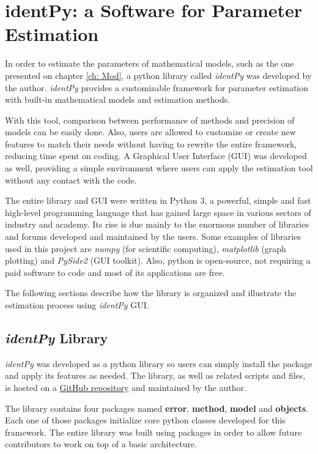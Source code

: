 \chapter{identPy: a Software for Parameter Estimation}

\label{ch: software}

In order to estimate the parameters of mathematical models, such as the one presented on chapter \ref{ch: Mod}, a python library called \textit{identPy} was developed by the author. \textit{identPy} provides a customizable framework for parameter estimation with built-in mathematical models and estimation methods. 

With this tool, comparison between performance of methods and precision of models can be easily done. Also, users are allowed to customize or create new features to match their needs without having to rewrite the entire framework, reducing time spent on coding. A Graphical User Interface (GUI) was developed as well, providing a simple environment where users can apply the estimation tool without any contact with the code.

The entire library and GUI were written in Python 3, a powerful, simple and fast high-level programming language that has gained large space in various sectors of industry and academy. Its rise is due mainly to the enormous number of libraries and forums developed and maintained by the users. Some examples of libraries used in this project are \textit{numpy} (for scientific computing), \textit{matplotlib} (graph plotting) and \textit{PySide2} (GUI toolkit). Also, python is open-source, not requiring a paid software to code and most of its applications are free.

The following sections describe how the library is organized and illustrate the estimation process using \textit{identPy} GUI.

\section{\textit{identPy} Library}

\textit{identPy} was developed as a python library so users can simply install the package and apply its features as needed. The library, as well as related scripts and files, is hosted on a \href{https://github.com/gnegrelli/identPy}{GitHub repository} and maintained by the author.

The library contains four packages named \textbf{error}, \textbf{method}, \textbf{model} and \textbf{objects}. Each one of those packages initialize core python classes developed for this framework. The entire library was built using packages in order to allow future contributors to work on top of a basic architecture.

